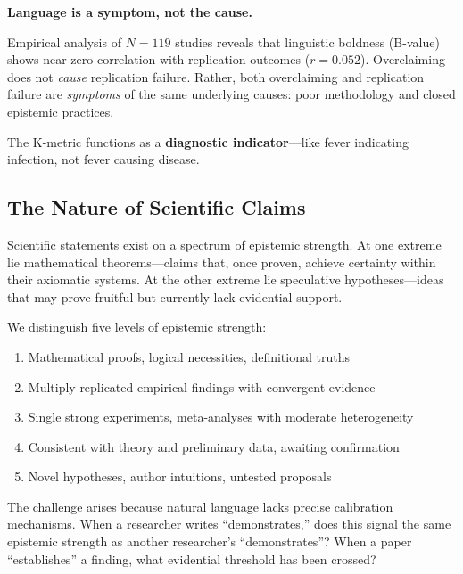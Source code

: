 \documentclass[11pt,a4paper]{article}
\begin{document}
\begin{keyinsight}[title={The Central Thesis of ESL 2.3}]
\textbf{Language is a symptom, not the cause.}

Empirical analysis of $N = 119$ studies reveals that linguistic boldness (B-value) shows near-zero correlation with replication outcomes ($r = 0.052$). Overclaiming does not \textit{cause} replication failure. Rather, both overclaiming and replication failure are \textit{symptoms} of the same underlying causes: poor methodology and closed epistemic practices.

The K-metric functions as a \textbf{diagnostic indicator}---like fever indicating infection, not fever causing disease.
\end{keyinsight}

\subsection{The Nature of Scientific Claims}

Scientific statements exist on a spectrum of epistemic strength. At one extreme lie mathematical theorems---claims that, once proven, achieve certainty within their axiomatic systems. At the other extreme lie speculative hypotheses---ideas that may prove fruitful but currently lack evidential support.

\begin{definitionbox}[title={Epistemic Strength Spectrum}]
We distinguish five levels of epistemic strength:

\begin{enumerate}[leftmargin=2cm]
    \item[\textbf{Certain}] Mathematical proofs, logical necessities, definitional truths
    \item[\textbf{Highly Probable}] Multiply replicated empirical findings with convergent evidence
    \item[\textbf{Probable}] Single strong experiments, meta-analyses with moderate heterogeneity
    \item[\textbf{Plausible}] Consistent with theory and preliminary data, awaiting confirmation
    \item[\textbf{Speculative}] Novel hypotheses, author intuitions, untested proposals
\end{enumerate}
\end{definitionbox}

The challenge arises because natural language lacks precise calibration mechanisms. When a researcher writes ``demonstrates,'' does this signal the same epistemic strength as another researcher's ``demonstrates''? When a paper ``establishes'' a finding, what evidential threshold has been crossed?
\end{document}
